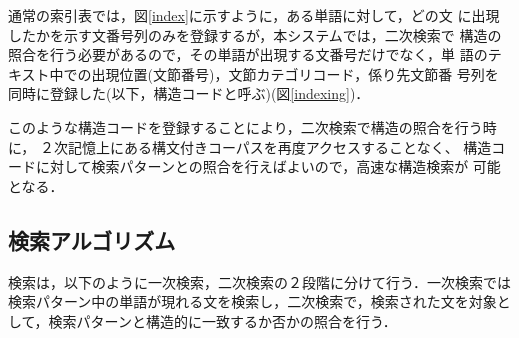 通常の索引表では，図\ref{index}に示すように，ある単語に対して，どの文
に出現したかを示す文番号列のみを登録するが，本システムでは，二次検索で
構造の照合を行う必要があるので，その単語が出現する文番号だけでなく，単
語のテキスト中での出現位置(文節番号)，文節カテゴリコード，係り先文節番
号列を同時に登録した(以下，構造コードと呼ぶ)(図\ref{indexing})．

このような構造コードを登録することにより，二次検索で構造の照合を行う時に，
２次記憶上にある構文付きコーパスを再度アクセスすることなく、
構造コードに対して検索パターンとの照合を行えばよいので，高速な構造検索が
可能となる．



\subsection{検索アルゴリズム}
検索は，以下のように一次検索，二次検索の２段階に分けて行う．一次検索では
検索パターン中の単語が現れる文を検索し，二次検索で，検索された文を対象と
して，検索パターンと構造的に一致するか否かの照合を行う．


